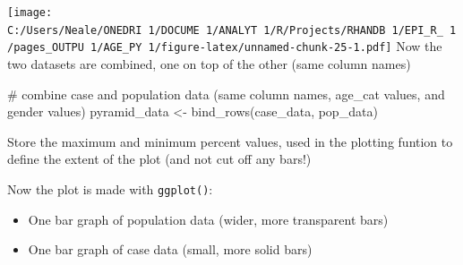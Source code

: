\documentclass[
]{article}
\newenvironment{Shaded}{\begin{snugshade}}{\end{snugshade}}
\newcommand{\CommentTok}[1]{\textcolor[rgb]{0.50,0.62,0.50}{#1}}
\newcommand{\DataTypeTok}[1]{\textcolor[rgb]{0.87,0.87,0.75}{#1}}
\newcommand{\KeywordTok}[1]{\textcolor[rgb]{0.94,0.87,0.69}{#1}}
\newcommand{\NormalTok}[1]{\textcolor[rgb]{0.80,0.80,0.80}{#1}}
\newcommand{\OperatorTok}[1]{\textcolor[rgb]{0.94,0.94,0.82}{#1}}
\newcommand{\StringTok}[1]{\textcolor[rgb]{0.80,0.58,0.58}{#1}}
\providecommand{\tightlist}{%
  \setlength{\itemsep}{0pt}\setlength{\parskip}{0pt}}
\begin{document}
\texttt{[image: C:/Users/Neale/ONEDRI~1/DOCUME~1/ANALYT~1/R/Projects/RHANDB~1/EPI\_R\_~1/pages\_OUTPU~1/AGE\_PY~1/figure-latex/unnamed-chunk-25-1.pdf]}
Now the two datasets are combined, one on top of the other (same column
names)

\begin{Shaded}
\begin{Highlighting}[]
\CommentTok{\# combine case and population data (same column names, age\_cat values, and gender values)}
\NormalTok{pyramid\_data \textless{}{-}}\StringTok{ }\KeywordTok{bind\_rows}\NormalTok{(case\_data, pop\_data)}
\end{Highlighting}
\end{Shaded}

Store the maximum and minimum percent values, used in the plotting
funtion to define the extent of the plot (and not cut off any bars!)

\begin{Shaded}
\end{Shaded}

Now the plot is made with \texttt{ggplot()}:

\begin{itemize}
\tightlist
\item
  One bar graph of population data (wider, more transparent bars)
\item
  One bar graph of case data (small, more solid bars)
\end{itemize}
\end{document}
